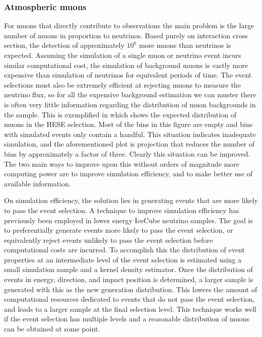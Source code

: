 \subsubsection{Atmospheric muons}
For muons that directly contribute to observations the main problem is the large number of muons in proportion to neutrinos.
Based purely on interaction cross section, the detection of approximately $10^6$ more muons than neutrinos is expected.
Assuming the simulation of a single muon or neutrino event incurs similar computational cost, the simulation of background muons is vastly more expensive than simulation of neutrinos for equivalent periods of time.
The event selections must also be extremely efficient at rejecting muons to measure the neutrino flux, so for all the expensive background estimation we can muster there is often very little information regarding the distribution of muon backgrounds in the sample.
This is exemplified in  which shows the expected distribution of muons in the HESE selection.
Most of the bins in this figure are empty and bins with simulated events only contain a handful.
This situation indicates inadequate simulation, and the aforementioned plot is projection that reduces the number of bins by approximately a factor of three.
Clearly this situation can be improved.
The two main ways to improve upon this without orders of magnitude more computing power are to improve simulation efficiency, and to make better use of available information.

On simulation efficiency, the solution lies in generating events that are more likely to pass the event selection.
A technique to improve simulation efficiency has previously been employed in lower energy IceCube neutrino samples.
The goal is to preferentially generate events more likely to pass the event selection, or equivalently reject events unlikely to pass the event selection before computational costs are incurred.
To accomplish this the distribution of event properties at an intermediate level of the event selection is estimated using a small simulation sample and a kernel density estimator.
Once the distribution of events in energy, direction, and impact position is determined, a larger sample is generated with this as the new generation distribution.
This lowers the amount of computational resources dedicated to events that do not pass the event selection, and leads to a larger sample at the final selection level.
This technique works well if the event selection has multiple levels and a reasonable distribution of muons can be obtained at some point.

